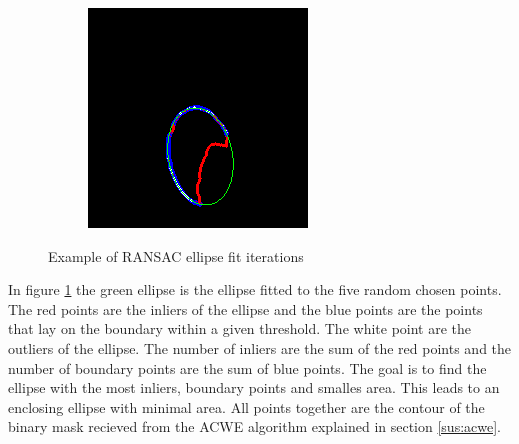 \begin{figure}[h]
\begin{subfigure}{0.3\textwidth}
    \end{subfigure}%
    \hfill
    \begin{subfigure}{0.3\textwidth}
        \centering
        \includegraphics[width=0.9\linewidth]{plots/ransac/test_mask112.png}

    \end{subfigure}%
    \caption{Example of RANSAC ellipse fit iterations}
    \label{fig:RANSAC_it}
\end{figure}

In figure \ref{fig:RANSAC_it} the green ellipse is the ellipse fitted to the five random chosen points. The red points are the inliers of the ellipse and the blue points are the points that lay on the boundary within a given threshold. The white point are the outliers of the ellipse. The number of inliers are the sum of the red points and the number of boundary points are the sum of blue points. The goal is to find the ellipse with the most inliers, boundary points and smalles area. This leads to an enclosing ellipse with minimal area. All points together are the contour of the binary mask recieved from the ACWE algorithm explained in section \ref{sus:acwe}.
\newpage
